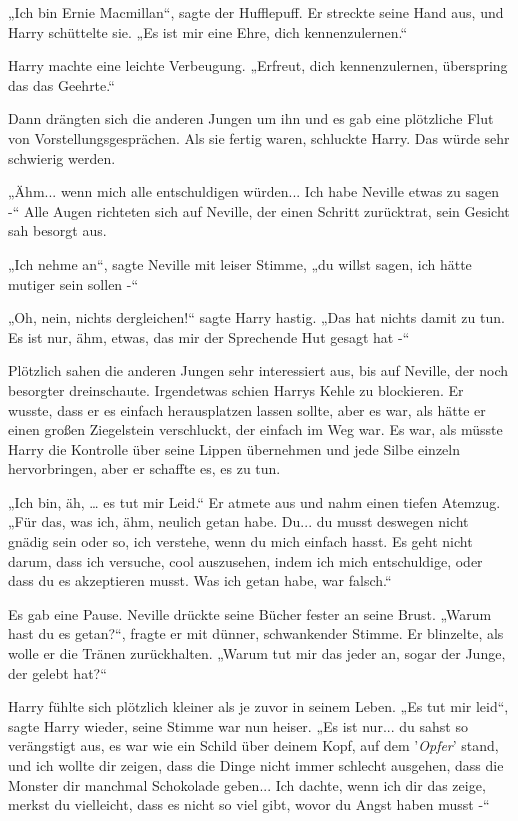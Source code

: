 {„Ich bin Ernie Macmillan“, sagte der Hufflepuff. Er streckte seine Hand aus, und Harry schüttelte sie. „Es ist mir eine Ehre, dich kennenzulernen.“

Harry machte eine leichte Verbeugung. „Erfreut, dich kennenzulernen, überspring das das Geehrte.“

Dann drängten sich die anderen Jungen um ihn und es gab eine plötzliche Flut von Vorstellungsgesprächen. Als sie fertig waren, schluckte Harry. Das würde sehr schwierig werden.

„Ähm... wenn mich alle entschuldigen würden... Ich habe Neville etwas zu sagen -“ Alle Augen richteten sich auf Neville, der einen Schritt zurücktrat, sein Gesicht sah besorgt aus.

„Ich nehme an“, sagte Neville mit leiser Stimme, „du willst sagen, ich hätte mutiger sein sollen -“

„Oh, nein, nichts dergleichen!“ sagte Harry hastig. „Das hat nichts damit zu tun. Es ist nur, ähm, etwas, das mir der Sprechende Hut gesagt hat -“

Plötzlich sahen die anderen Jungen sehr interessiert aus, bis auf Neville, der noch besorgter dreinschaute. Irgendetwas schien Harrys Kehle zu blockieren. Er wusste, dass er es einfach herausplatzen lassen sollte, aber es war, als hätte er einen großen Ziegelstein verschluckt, der einfach im Weg war. Es war, als müsste Harry die Kontrolle über seine Lippen übernehmen und jede Silbe einzeln hervorbringen, aber er schaffte es, es zu tun.

„Ich bin, äh, … es tut mir Leid.“ Er atmete aus und nahm einen tiefen Atemzug. „Für das, was ich, ähm, neulich getan habe. Du... du musst deswegen nicht gnädig sein oder so, ich verstehe, wenn du mich einfach hasst. Es geht nicht darum, dass ich versuche, cool auszusehen, indem ich mich entschuldige, oder dass du es akzeptieren musst. Was ich getan habe, war falsch.“

Es gab eine Pause. Neville drückte seine Bücher fester an seine Brust. „Warum hast du es getan?“, fragte er mit dünner, schwankender Stimme. Er blinzelte, als wolle er die Tränen zurückhalten. „Warum tut mir das jeder an, sogar der Junge, der gelebt hat?“

Harry fühlte sich plötzlich kleiner als je zuvor in seinem Leben. „Es tut mir leid“, sagte Harry wieder, seine Stimme war nun heiser. „Es ist nur... du sahst so verängstigt aus, es war wie ein Schild über deinem Kopf, auf dem '\emph{Opfer}' stand, und ich wollte dir zeigen, dass die Dinge nicht immer schlecht ausgehen, dass die Monster dir manchmal Schokolade geben... Ich dachte, wenn ich dir das zeige, merkst du vielleicht, dass es nicht so viel gibt, wovor du Angst haben musst -“

}
